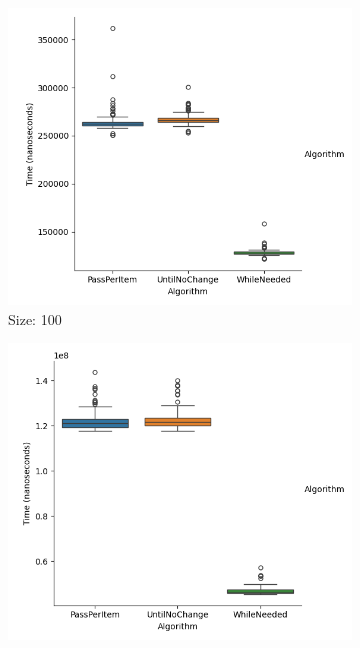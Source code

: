 \documentclass{article}
\begin{document}
\begin{figure}[ht]
  \centering
  \begin{subfigure}{0.3\textwidth}
    \centering
    \includegraphics[width=\linewidth]{../figureStringDesc100.png}
    \caption{Size: 100}
    \label{fig:img1}
  \end{subfigure}
  \begin{subfigure}{0.3\textwidth}
    \centering
    \includegraphics[width=\linewidth]{../figureStringDesc1000.png}

\end{subfigure}
\end{figure}
\end{document}
